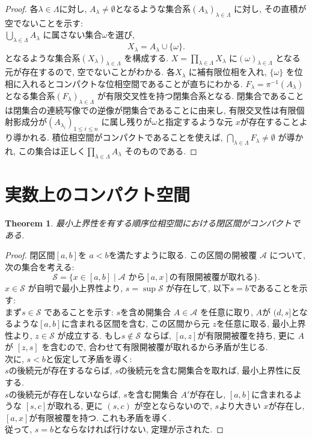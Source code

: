 \documentclass[lualatex]{ltjsbook}
\newtheorem{theorem}{Theorem}[chapter]
\theoremstyle{remark}
\theoremstyle{plain}
\begin{document}
\begin{proof}
	各$\lambda \in \Lambda$に対し,  $A_{\lambda} \neq \emptyset$となるような集合系$\left( A_{\lambda} \right) _{\lambda \in \Lambda}$ に対し,  その直積が空でないことを示す:\\
	$\bigcup_{\lambda \in  \Lambda} A_{\lambda}$ に属さない集合$\omega$を選び, 
	 \[
	X_{\lambda }= A_{\lambda} \cup \{ \omega\} 
	.\] 
	となるような集合系$\left( X_{\lambda} \right) _{\lambda \in \Lambda}$ を構成する. $X = \prod_{\lambda \in \Lambda} X_{\lambda}  $ に$(\omega)_{\lambda \in \Lambda}$ となる元が存在するので,  空でないことがわかる. 各$X_{\lambda}$ に補有限位相を入れ,  $\{\omega\} $ を位相に入れるとコンパクトな位相空間であることが直ちにわかる. $F_{\lambda} = \pi ^{-1} \left( A_{\lambda} \right) $ となる集合系$\left( F_{\lambda} \right) _{\lambda \in \Lambda}$ が有限交叉性を持つ閉集合系となる. 閉集合であることは閉集合の連続写像での逆像が閉集合であることに由来し,  有限交叉性は有限個射影成分が$(A_{\lambda_i})_{1\le i \le n}$ に属し残りが$\omega$と指定するような元 $x$が存在することより導かれる. 積位相空間がコンパクトであることを使えば,  $\bigcap_{\lambda \in \Lambda} F_{\lambda} \neq \emptyset$ が導かれ,  この集合は正しく$\prod_{\lambda \in \Lambda} A_{\lambda}$ そのものである. 
\end{proof}


\section{実数上のコンパクト空間}

\begin{theorem}
	最小上界性を有する順序位相空間における閉区間がコンパクトである.
\end{theorem}

\begin{proof}
	閉区間$[a, b]$を $a<b$を満たすように取る. この区間の開被覆 $\mathcal{A}$ について,  次の集合を考える:
	\[
		\mathcal{S} = \{ x \in [a, b]  \mid  \text{$\mathcal{A}$ から$[a, x]$の有限開被覆が取れる}\} 
	.\] 
	$x \in \mathcal{S}$ が自明で最小上界性より,  $s = \sup \mathcal{S}$ が存在して,  以下$s =b$であることを示す:\\
	まず$s \in \mathcal{S}$ であることを示す: $s$を含め開集合 $A\in \mathcal{A}$ を任意に取り,  $A$が $(d, s]$となるような$[a, b]$に含まれる区間を含む,  この区間から元 $z$を任意に取る,  最小上界性より,   $z \in \mathcal{S}$ が成立する. もし$s \not\in \mathcal{S}$ ならば,  $[a, z]$が有限開被覆を持ち, 更に $A$が $[z, s]$ を含むので,  合わせて有限開被覆が取れるから矛盾が生じる.\\
	次に,  $s <b$と仮定して矛盾を導く: \\
	 $s$の後続元が存在するならば,   $s$の後続元を含む開集合を取れば,  最小上界性に反する.\\
	 $s$の後続元が存在しないならば,   $s$を含む開集合 $A'$が存在し,   $[a, b]$に含まれるような $[s, c]$が取れる,  更に $\left( s, c \right) $ が空とならないので,  $s$より大きい $x$が存在し,   $[a, x]$が有限被覆を持つ. これも矛盾を導く. \\
	 従って,   $s=b$とならなければ行けない, 定理が示された.
\end{proof}
\end{document}
